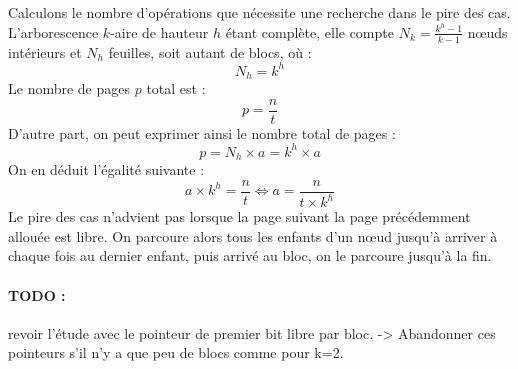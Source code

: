 \documentclass{article}
\begin{document}
  Calculons le nombre d'opérations que nécessite une recherche dans le pire des cas. L'arborescence $k$-aire de hauteur $h$ étant complète, elle compte $N_{k} = \frac{k^{h} -1 }{k-1}$ nœuds intérieurs et  $N_{h}$ feuilles, soit autant de blocs, où :
\begin{equation}
N_{h} = k^{h}
\end{equation}
Le nombre de pages $p$ total est :
\begin{equation}
p=\frac{n}{t}
\end{equation}
D'autre part, on peut exprimer ainsi le nombre total de pages :
\begin{equation}
p = N_{h} \times a = k^{h} \times a
\end{equation}
On en déduit l'égalité suivante :
\begin{equation}
a \times k^{h} = \frac{n}{t} \Leftrightarrow a = \frac{n}{t \times k^{h}}
\end{equation}
Le pire des cas n'advient pas lorsque la page suivant la page précédemment allouée est libre. 
On parcoure alors tous les enfants d'un nœud jusqu'à arriver à chaque fois au dernier enfant, puis arrivé au bloc, on le parcoure jusqu'à la fin.
\paragraph*{TODO :} revoir l'étude avec le pointeur de premier bit libre par bloc.  -> Abandonner ces pointeurs s'il n'y a que peu de blocs comme pour k=2.\\
\end{document}
